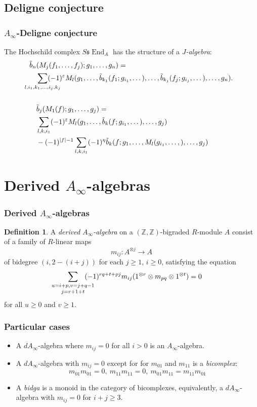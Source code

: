\documentclass{beamer}
\theoremstyle{definition}
\newtheorem{defi}{Definition}
\newcommand{\Z}{\mathbb{Z}}
\newcommand{\s}{\mathfrak{s}}
\DeclareMathOperator{\End}{End}
\begin{document}
\subsection{Deligne conjecture}
\begin{frame}
\frametitle{$A_\infty$-Deligne conjecture}
\begin{theorem} %
The Hochschild complex $S\s\End_A$ has the structure of a \emph{$J$-algebra}:
\begin{align*}
\tilde{b}_n&(M_j(f_1,\dots, f_j);g_1,\dots, g_n)=\\
&\sum_{\mathclap{l,i_1,k_1,\dots, i_j,k_j}}(-1)^{\varepsilon}M_l(g_1,\dots, \tilde{b}_{k_1}(f_1;g_{i_1},\dots),\dots, \tilde{b}_{k_j}(f_j;g_{i_j},\dots),\dots, g_n).\\ 
\\
&\tilde{b}_j(M_1(f);g_1,\dots, g_j)=\\
&\sum_{l,k,i_1}(-1)^{\varepsilon}M_l(g_1,\dots, \tilde{b}_{k}(f;g_{i_1},\dots),\dots, g_j)\\
&-(-1)^{|f|-1}\sum_{l,k,i_1} (-1)^{\eta} \tilde{b}_k(f;g_1,\dots, M_l(g_{i_1},\dots,), \dots, g_j)
\end{align*}
\end{theorem}
\end{frame}

\section{Derived $A_\infty$-algebras}

\begin{frame}
\frametitle{Derived $A_\infty$-algebras}
\begin{defi}
  A \emph{derived $A_\infty$-algebra} on a $(\Z,\Z)$-bigraded $R$-module $A$ consist of a family of $R$-linear maps 
\[m_{ij}:A^{\otimes j}\to A\]
of bidegree $(i,2-(i+j))$ for each $j\geq 1$, $i\geq 0$, satisfying the equation
\begin{equation*}
\underset{j=r+1+t}{\sum_{\mathclap{u=i+p, v=j+q-1}}}(-1)^{rq+t+pj}m_{ij}(1^{\otimes r}\otimes m_{pq}\otimes 1^{\otimes t})=0
\end{equation*}
for all $u\geq 0$ and $v\geq 1$. 
\end{defi}
\end{frame}

\begin{frame}
\frametitle{Particular cases}
\begin{itemize}
\item<1-> A $dA_\infty$-algebra where $m_{ij}=0$ for all $i>0$ is an $A_\infty$-algebra.
\item<2-> A $dA_\infty$-algebra with $m_{ij}=0$ except for for $m_{01}$ and $m_{11}$ is a \emph{bicomplex}: 
\[m_{01}m_{01}=0,\ m_{11}m_{11}=0,\ m_{01}m_{11}=m_{11}m_{01}\]
\item<3-> A \emph{bidga} is a monoid in the category of bicomplexes, equivalently, a $dA_\infty$-algebra with $m_{ij}=0$ for $i+j\geq 3$.
\end{itemize}
\end{frame}
\end{document}
